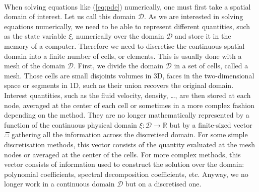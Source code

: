     \paragraph{}
    When solving equations like (\ref{eq:pde}) numerically, one must first take a spatial domain of interest.
    Let us call this domain $\mathcal{D}$.
    As we are interested in solving equations numerically, we need to be able to represent different quantities, such as the state variable $\xi$, numerically over the domain $\mathcal{D}$ and store it in the memory of a computer.
    Therefore we need to discretise the continuous spatial domain into a finite number of cells, or elements.
    This is usually done with a mesh of the domain $\mathcal{D}$.
    First, we divide the domain $\mathcal{D}$ in a set of cells, called a mesh.
    Those cells are small disjoints volumes in 3D, faces in the two-dimensional space or segments in 1D, such as their union recovers the original domain.
    Interest quantities, such as the fluid velocity, density, \dots, are then stored at each node, averaged at the center of each cell or sometimes in a more complex fashion depending on the method.
    They are no longer mathematically represented by a function of the continuous physical domain $\xi: \mathcal{D} \rightarrow \mathbb{R}$ but by a finite-sized vector $\Xi$ gathering all the information across the discretised domain.
    For some simple discretisation methods, this vector consists of the quantity evaluated at the mesh nodes or averaged at the center of the cells.
    For more complex methods, this vector consists of information used to construct the solution over the domain: polynomial coefficients, spectral decomposition coefficients, etc.
    Anyway, we no longer work in a continuous domain $\mathcal{D}$ but on a discretised one.

